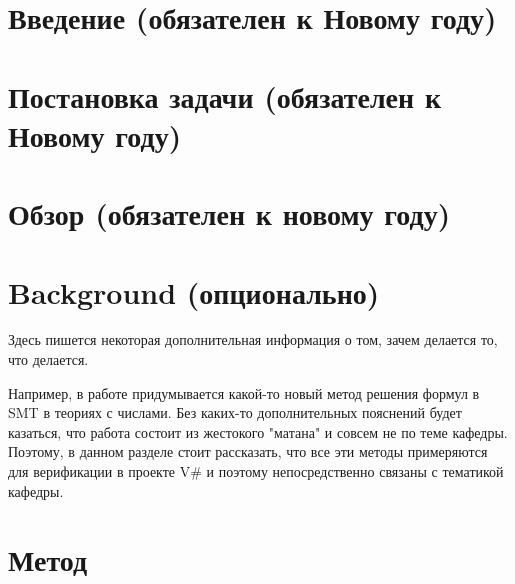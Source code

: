 


\usepackage{totcount}

\usepackage{caption}
\usepackage{listings}




\maketitle
\setcounter{tocdepth}{2}
\tableofcontents


\section{Введение (обязателен к Новому году)}


\section{Постановка задачи (обязателен к Новому году)}


\section{Обзор (обязателен к новому году)}


\section{Background (опционально)}
Здесь пишется некоторая дополнительная информация о том, зачем делается то, что делается.

Например, в работе придумывается какой-то новый метод решения формул в SMT в теориях с числами. Без каких-то дополнительных пояснений будет казаться, что работа состоит из жестокого "матана" и совсем не по теме кафедры. Поэтому, в данном разделе стоит рассказать, что все эти методы примеряются для верификации в проекте V\# и поэтому непосредственно связаны с тематикой кафедры.


\section{Метод}



